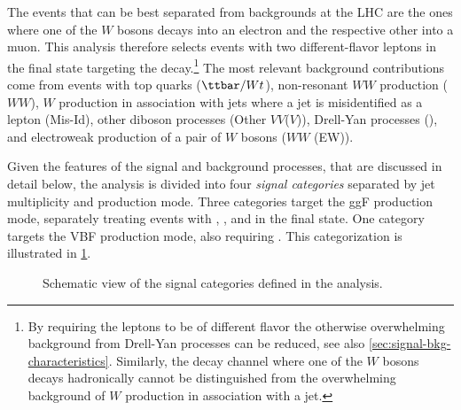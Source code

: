 The \HWW events that can be best separated from backgrounds at the LHC are the ones where one of the $W$ bosons decays into an electron and the respective other into a muon.
This analysis therefore selects events with two different-flavor leptons in the final state targeting the \HWWdet decay.\footnote{By requiring the leptons to be of different flavor the otherwise overwhelming background from Drell-Yan processes can be reduced, see also \cref{sec:signal-bkg-characteristics}. Similarly, the decay channel where one of the $W$ bosons decays hadronically cannot be distinguished from the overwhelming background of $W$ production in association with a jet.} 
The most relevant background contributions come from events with top quarks ($\ttbar/Wt$), non-resonant $WW$ production ($WW$), $W$ production in association with jets where a jet is misidentified as a lepton (Mis-Id), other diboson processes (Other $VV$($V$)), Drell-Yan processes (\Zgamma), and electroweak production of a pair of $W$ bosons ($WW$ (EW)). 

Given the features of the signal and background processes, that are discussed in detail below, the analysis is divided into four \emph{signal categories} separated by jet multiplicity and production mode.
Three categories target the ggF production mode, separately treating events with \ZeroJet, \OneJet, and \TwoJet in the final state. One category targets the VBF production mode, also requiring \TwoJet. 
This categorization is illustrated in \cref{fig:signal-categorization}.
\begin{figure}[ht]
    \caption{Schematic view of the signal categories defined in the \HWW analysis.}
    \label{fig:signal-categorization}
\end{figure}

